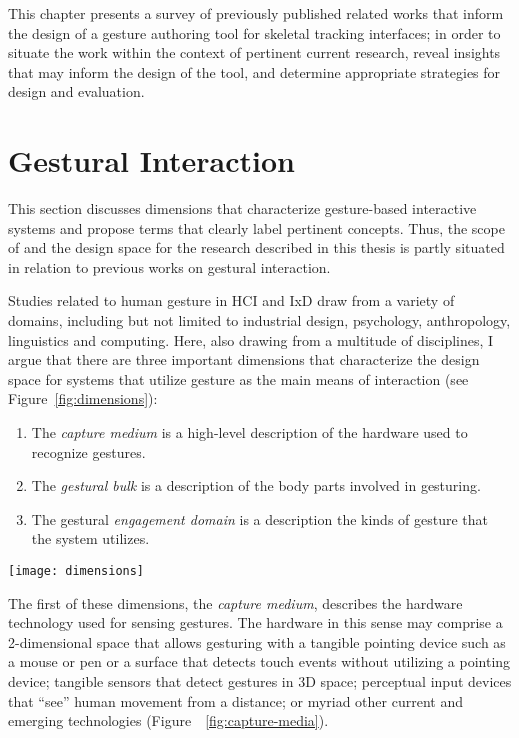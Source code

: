 This chapter presents a survey of previously published related works that inform the design of a gesture authoring tool for skeletal tracking interfaces; in order to situate the work within the context of pertinent current research, reveal insights that may inform the design of the tool, and determine appropriate strategies for design and evaluation.

\section{Gestural Interaction}
\label{sec:gestural-interaction}

This section discusses dimensions that characterize gesture-based interactive systems and propose terms that clearly label pertinent concepts. Thus, the scope of and the design space for the research described in this thesis is partly situated in relation to previous works on gestural interaction.

Studies related to human gesture in HCI and IxD draw from a variety of domains, including but not limited to industrial design, psychology, anthropology, linguistics and computing. Here, also drawing from a multitude of disciplines, I argue that there are three important dimensions that characterize the design space for systems that utilize gesture as the main means of interaction (see Figure~\ref{fig:dimensions}):

\begin{enumerate}
\item The \emph{capture medium} is a high-level description of the hardware used to recognize gestures.
\item	The \emph{gestural bulk} is a description of the body parts involved in gesturing.
\item The gestural \emph{engagement domain} is a description the kinds of gesture that the system utilizes.
\end{enumerate}

\begin{SCfigure}[\sidecaptionrelwidth][b]
\centering
\texttt{[image: dimensions]}
\caption{Visualizing the three dimensions that characterize gesture-based interactive systems.}
\label{fig:dimensions}
\end{SCfigure}

\clearpage

The first of these dimensions, the \emph{capture medium}, describes the hardware technology used for sensing gestures. The hardware in this sense may comprise a 2-dimensional space that allows gesturing with a tangible pointing device such as a mouse or pen or a surface that detects touch events without utilizing a pointing device; tangible sensors that detect gestures in 3D space; perceptual input devices that “see” human movement from a distance; or myriad other current and emerging technologies (Figure~~\ref{fig:capture-media}).

